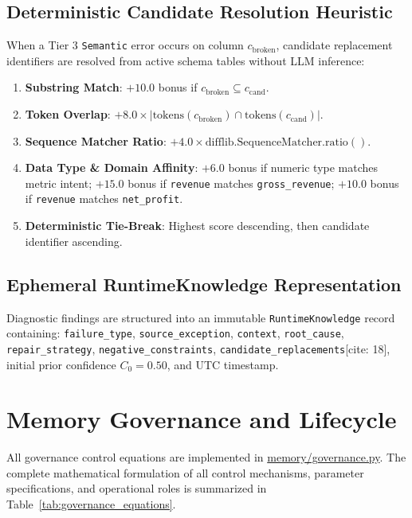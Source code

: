 \subsection{Deterministic Candidate Resolution Heuristic}
When a Tier 3 \texttt{Semantic} error occurs on column $c_{\text{broken}}$, candidate replacement identifiers are resolved from active schema tables without LLM inference:
\begin{enumerate}
    \item \textbf{Substring Match}: $+10.0$ bonus if $c_{\text{broken}} \subseteq c_{\text{cand}}$.
    \item \textbf{Token Overlap}: $+8.0 \times |\text{tokens}(c_{\text{broken}}) \cap \text{tokens}(c_{\text{cand}})|$.
    \item \textbf{Sequence Matcher Ratio}: $+4.0 \times \text{difflib.SequenceMatcher.ratio}()$.
    \item \textbf{Data Type \& Domain Affinity}: $+6.0$ bonus if numeric type matches metric intent; $+15.0$ bonus if \texttt{revenue} matches \texttt{gross\_revenue}; $+10.0$ bonus if \texttt{revenue} matches \texttt{net\_profit}.
    \item \textbf{Deterministic Tie-Break}: Highest score descending, then candidate identifier ascending.
\end{enumerate}

\subsection{Ephemeral RuntimeKnowledge Representation}
Diagnostic findings are structured into an immutable \texttt{Runtime\-Knowledge} record containing: \texttt{failure\_\allowbreak type}, \allowbreak\texttt{source\_\allowbreak exception}, \allowbreak\texttt{context}, \allowbreak\texttt{root\_\allowbreak cause}, \allowbreak\texttt{repair\_\allowbreak strategy}, \allowbreak\texttt{negative\_\allowbreak constraints}, \allowbreak\texttt{candidate\_\allowbreak replacements}[cite: 18], initial prior confidence $C_0 = 0.50$, and UTC timestamp.

\section{Memory Governance and Lifecycle}

All governance control equations are implemented in \url{memory/governance.py}. The complete mathematical formulation of all control mechanisms, parameter specifications, and operational roles is summarized in Table~\ref{tab:governance_equations}.

